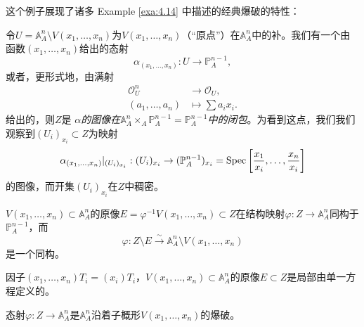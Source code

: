 这个例子展现了诸多 Example \ref{exa:4.14} 中描述的经典爆破的特性：
\begin{compactenum}[(1)]
	\item 令$U=\mathbb A_A^n\setminus V(x_1,\dots,x_n)$为$V(x_1,\dots,x_n)$（“原点”）在$\mathbb A_A^n$中的补。我们有一个由函数$(x_1,\dots,x_n)$给出的态射
	\[
		\alpha_{(x_1,\dots,x_n)}:U\to \mathbb P_A^{n-1},
	\]
	或者，更形式地，由满射
	\[
		\begin{aligned}
			\mathscr O_U^n & \longrightarrow \mathscr O_U,\\
			(a_1,\dots,a_n)&\longmapsto \sum a_ix_i.
		\end{aligned}
	\]
	给出的，则$Z$是 \textit{$\alpha$的图像在$\mathbb A_A^n\times_A \mathbb P_A^{n-1}=\mathbb P_A^{n-1}$中的闭包}。为看到这点，我们我们观察到$(U_i)_{x_i}\subset Z$为映射
	\[
		\alpha_{(x_1,\dots,x_n)}|_{(U_i)_{x_i}}:(U_i)_{x_i}\to (\mathbb P_A^{n-1})_{x_i}=\operatorname{Spec} \left[\frac{x_1}{x_i},\dots,\frac{x_n}{x_i}\right]
	\]
	的图像，而开集$(U_i)_{x_i}$在$Z$中稠密。
	\item $V(x_1,\dots,x_n)\subset \mathbb A_A^n$的原像$E=\varphi^{-1}V(x_1,\dots,x_n)\subset Z$在结构映射$\varphi:Z\to \mathbb A_A^n$同构于$\mathbb P_A^{n-1}$，而
	\[
		\varphi:Z\setminus E\xrightarrow{\sim}\mathbb A_A^n\setminus V(x_1,\dots,x_n)
	\]
	是一个同构。
	\item 因子$(x_1,\dots,x_n)T_i=(x_i)T_i$，$V(x_1,\dots,x_n)\subset \mathbb A_A^n$的原像$E\subset Z$是局部由单一方程定义的。
\end{compactenum}

\begin{pro}\label{pro:4.18}
	态射$\varphi:Z\to \mathbb A_A^n$是$\mathbb A_A^n$沿着子概形$V(x_1,\dots,x_n)$的爆破。
\end{pro}


